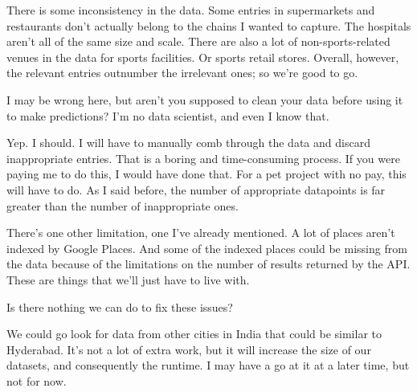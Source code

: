 There is some inconsistency in the data. Some entries in supermarkets and restaurants don't actually belong to the chains I wanted to capture. The hospitals aren't all of the same size and scale. There are also a lot of non-sports-related venues in the data for sports facilities. Or sports retail stores. Overall, however, the relevant entries outnumber the irrelevant ones; so we're good to go.

{\color{blue} I may be wrong here, but aren't you supposed to clean your data before using it to make predictions? I'm no data scientist, and even I know that.}

Yep. I should. I will have to manually comb through the data and discard inappropriate entries. That is a boring and time-consuming process. If you were paying me to do this, I would have done that. For a pet project with no pay, this will have to do. As I said before, the number of appropriate datapoints is far greater than the number of inappropriate ones. 

There's one other limitation, one I've already mentioned. A lot of places aren't indexed by Google Places. And some of the indexed places could be missing from the data because of the limitations on the number of results returned by the API. These are things that we'll just have to live with.  

{\color{blue} Is there nothing we can do to fix these issues?}

We could go look for data from other cities in India that could be similar to Hyderabad. It's not a lot of extra work, but it will increase the size of our datasets, and consequently the runtime. I may have a go at it at a later time, but not for now. 

